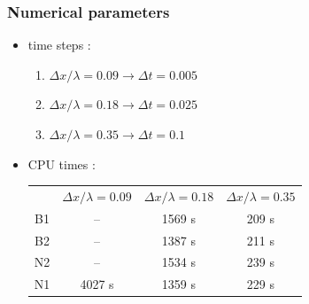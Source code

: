\subsubsection{Numerical parameters}
\begin{itemize}
\item time steps :
	\begin{enumerate}
    \item $\Delta x / \lambda = 0.09  \rightarrow \Delta t = 0.005 $
    \item $\Delta x / \lambda = 0.18  \rightarrow \Delta t = 0.025 $
    \item $\Delta x / \lambda = 0.35  \rightarrow \Delta t = 0.1 $
  \end{enumerate}
\item CPU times : \\
\begin{tabular}{cccc}
 & $\Delta x / \lambda = 0.09 $ &$\Delta x / \lambda = 0.18 $&$\Delta x / \lambda = 0.35 $\\
 B1 & -- & 1569 s & 209 s \\
 B2 & -- & 1387 s & 211 s \\
 N2 & -- & 1534 s & 239 s \\
 N1 & 4027 s & 1359 s & 229 s\\

\end{tabular}
\end{itemize}

